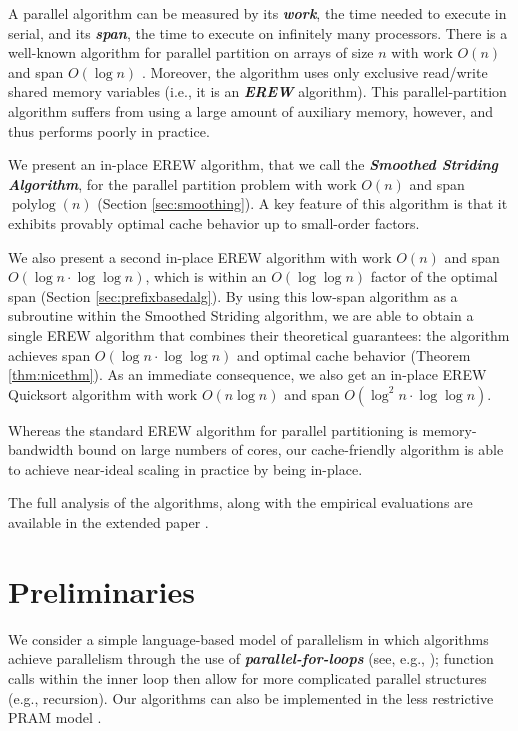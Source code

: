 \documentclass[sigconf, 10pt, nonacm]{acmart}
\newcommand{\polylog}{\operatorname{polylog}}
\newcommand{\defn}[1]{{\textit{\textbf{\boldmath #1}}}}
\renewcommand{\paragraph}[1]{\vspace{0.09in}\noindent{\bf \boldmath #1.}}
\theoremstyle{remark}
\theoremstyle{remark}
\begin{document}
A parallel algorithm can be measured by its \defn{work}, the time
needed to execute in serial, and its \defn{span}, the time to execute
on infinitely many processors. There is a well-known algorithm for
parallel partition on arrays of size $n$ with work $O(n)$ and span
$O(\log n)$ \cite{Blelloch96,AcarBl16}. Moreover, the algorithm uses
only exclusive read/write shared memory variables (i.e., it is an
\defn{EREW} algorithm).
This parallel-partition algorithm suffers from using a large amount of
auxiliary memory, however, and thus performs poorly in practice. 

\paragraph{Results}
We present an in-place EREW algorithm, that we call the \defn{Smoothed Striding
Algorithm}, for the parallel partition problem with work $O(n)$ and span
$\polylog(n)$ (Section \ref{sec:smoothing}). A key feature of this algorithm is
that it exhibits provably optimal cache behavior up to small-order factors.

We also present a second in-place EREW algorithm with work $O(n)$ and span
$O(\log n \cdot \log \log n)$, which is within an $O(\log\log n)$ factor of the
optimal span (Section \ref{sec:prefixbasedalg}). By using this low-span
algorithm as a subroutine within the Smoothed Striding algorithm, we are able to
obtain a single EREW algorithm that combines their theoretical guarantees: the
algorithm achieves span $O(\log n \cdot \log \log n)$ and optimal cache
behavior (Theorem \ref{thm:nicethm}). As an immediate consequence, we also get an in-place EREW Quicksort
algorithm with work $O(n \log n)$ and span $O(\log^2 n \cdot \log \log n)$.

Whereas the standard EREW algorithm for parallel partitioning is
memory-bandwidth bound on large numbers of cores, our cache-friendly
algorithm is able to achieve near-ideal scaling in practice by being in-place.

The full analysis of the algorithms, along with the empirical evaluations are available in the extended paper \cite{ARXIV}.


\section{Preliminaries}\label{secprelim}

\paragraph{Workflow Model} We consider a simple language-based model of parallelism in which algorithms achieve parallelism through the use of \defn{parallel-for-loops} (see, e.g.,
\cite{Blelloch96,AcarBl16}); function calls within the inner loop
then allow for more complicated parallel structures (e.g., recursion). Our algorithms can also be implemented in the less restrictive PRAM model \cite{Blelloch96, AcarBl16}.
\end{document}
